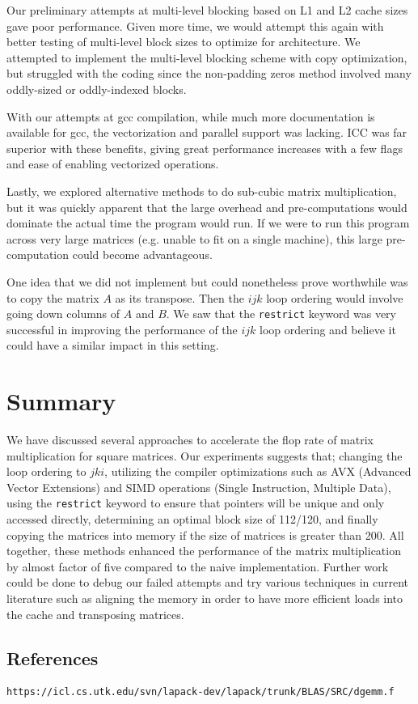 \documentclass[12pt]{article}
\begin{document}
Our preliminary attempts at multi-level blocking based on L1 and L2 cache sizes gave poor performance.
Given more time, we would attempt this again with better testing of multi-level block sizes to optimize for architecture.
We attempted to implement the multi-level blocking scheme with copy optimization, but struggled with the coding since the non-padding zeros method involved many oddly-sized or oddly-indexed blocks.

With our attempts at gcc compilation, while much more documentation is available for gcc, the vectorization and parallel support was lacking. ICC was far superior with these benefits, giving great performance increases with a few flags and ease of enabling vectorized operations. 

Lastly, we explored alternative methods to do sub-cubic matrix multiplication, but it was quickly apparent that the large overhead and pre-computations would dominate the actual time the program would run. If we were to run this program across very large matrices (e.g. unable to fit on a single machine), this large pre-computation could become advantageous.

One idea that we did not implement but could nonetheless prove worthwhile was to copy the matrix $A$ as its transpose.
Then the $ijk$ loop ordering would involve going down columns of $A$ and $B$.
We saw that the \texttt{restrict} keyword was very successful in improving the performance of the $ijk$ loop ordering and believe it could have a similar impact in this setting.

\section{Summary}

We have discussed several approaches to accelerate the flop rate of matrix multiplication for square matrices.
Our experiments suggests that; changing the loop ordering to $jki$, utilizing the compiler optimizations such as AVX (Advanced Vector Extensions) and SIMD operations (Single Instruction, Multiple Data), using the \texttt{restrict} keyword to ensure that pointers will be unique and only accessed directly, determining an optimal block size of 112/120, and finally copying the matrices into memory if the size of matrices is greater than 200.
All together, these methods enhanced the performance of the matrix multiplication by almost factor of five compared to the naive implementation.
Further work could be done to debug our failed attempts and try various techniques in current literature such as aligning the memory in order to have more efficient loads into the cache and transposing matrices. 

\subsection{References}

\begin{verbatim}
https://icl.cs.utk.edu/svn/lapack-dev/lapack/trunk/BLAS/SRC/dgemm.f

\end{verbatim}
\end{document}
